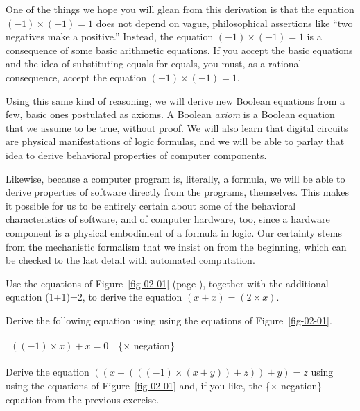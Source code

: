 One of the things we hope you will glean from this derivation is that
the equation $(-1)\times(-1) = 1$ does not depend on vague,
philosophical assertions like ``two negatives make a positive.''
Instead, the equation $(-1)\times(-1) = 1$ is a consequence of some
basic arithmetic equations. If you accept the basic equations
and the idea of substituting equals for equals, you must, as a
rational consequence, accept the equation $(-1)\times(-1) = 1$.

Using this same kind of reasoning, we will derive new Boolean equations
from a few, basic ones postulated as axioms.
A Boolean \emph{axiom} is a Boolean equation
that we assume to be true, without proof.
We will also learn that digital circuits are physical
manifestations of logic formulas, and we will be able to
parlay that idea to derive behavioral properties of
computer components.

Likewise, because a computer program is,
literally, a formula, we will be able to derive
properties of software directly from the programs, themselves. 
This makes it possible for us to be entirely
certain about some of the behavioral characteristics of
software, and of computer hardware, too,
since a hardware component is a physical embodiment of a formula
in logic.
Our certainty stems from the mechanistic
formalism that we insist on from the beginning,
which can be checked to the last detail with automated computation.

\begin{ExerciseList}
\label{ex:ch02-intro}
\Exercise
Use the equations of Figure~\ref{fig-02-01} (page \pageref{fig-02-01}),
together with the additional equation (1+1)=2, to derive the equation $(x + x) = (2 \times x)$.

\Exercise
Derive the following equation
using using the equations of Figure~\ref{fig-02-01}.
\begin{center}
\begin{tabular}{ll}
$((-1) \times x) + x = 0$    & \{$\times$ negation\}
\end{tabular}
\end{center}

\Exercise
Derive the equation $((x + (((-1) \times (x + y)) + z)) + y) = z$
using using the equations of Figure~\ref{fig-02-01} and,
if you like,
the \{$\times$ negation\} equation from the previous exercise.
\end{ExerciseList}


